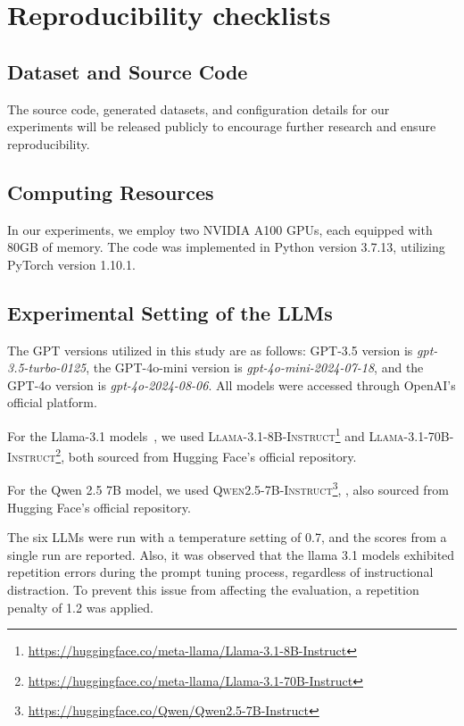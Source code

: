 
\section{Reproducibility checklists}
\label{A}


\subsection{Dataset and Source Code}

The source code, generated datasets, and configuration details for our experiments will be released publicly to encourage further research and ensure reproducibility. 


\subsection{Computing Resources}
In our experiments, we employ two NVIDIA A100 GPUs, each equipped with 80GB of memory. The code was implemented in Python version 3.7.13, utilizing PyTorch version 1.10.1.

\subsection{Experimental Setting of the LLMs}

The GPT versions utilized in this study are as follows: GPT-3.5 version is \textit{gpt-3.5-turbo-0125}, the GPT-4o-mini version is \textit{gpt-4o-mini-2024-07-18}, and the GPT-4o version is \textit{gpt-4o-2024-08-06}. All models were accessed through OpenAI's official platform.

For the Llama-3.1 models~\cite{dubey2024llama}, we used \textsc{Llama-3.1-8B-Instruct}\footnote{\url{https://huggingface.co/meta-llama/Llama-3.1-8B-Instruct}} and \textsc{Llama-3.1-70B-Instruct}\footnote{\url{https://huggingface.co/meta-llama/Llama-3.1-70B-Instruct}}, both sourced from Hugging Face’s official repository.

For the Qwen 2.5 7B model, we used \textsc{Qwen2.5-7B-Instruct}\footnote{\url{https://huggingface.co/Qwen/Qwen2.5-7B-Instruct}}, , also sourced from Hugging Face’s official repository.

The six LLMs were run with a temperature setting of 0.7, and the scores from a single run are reported. Also, it was observed that the llama 3.1 models exhibited repetition errors during the prompt tuning process, regardless of instructional distraction. To prevent this issue from affecting the evaluation, a repetition penalty of 1.2 was applied.

